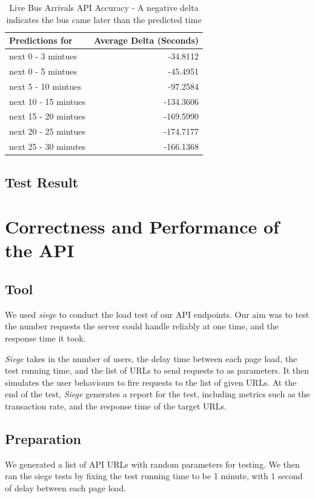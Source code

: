 \begin{table}
\centering
\begin{tabular}{@{}lr@{}} \toprule
Predictions for & Average Delta (Seconds) \\ \midrule
next 0 - 3 mintues & -34.8112 \\
next 0 - 5 mintues & -45.4951 \\
next 5 - 10 mintues & -97.2584 \\
next 10 - 15 mintues & -134.3606 \\
next 15 - 20 mintues & -169.5990 \\
next 20 - 25 mintues & -174.7177 \\
next 25 - 30 minutes & -166.1368 \\
\bottomrule
\end{tabular}
\caption{Live Bus Arrivals API Accuracy - A negative delta indicates the bus came later than the predicted time}
\label{table:countdown_evaluation}
\end{table}

\subsection{Test Result}

\section{Correctness and Performance of the API}
\subsection{Tool}
\par We used \textit{siege}\cite{siege} to conduct the load test of our API endpoints. Our aim was to test the number requests the server could handle reliably at one time, and the response time it took.

\par \textit{Siege} takes in the number of users, the delay time between each page load, the test running time, and the list of URLs to send requests to as parameters. It then simulates the user behaviours to fire requests to the list of given URLs. At the end of the test, \textit{Siege} generates a report for the test, including metrics such as the transaction rate, and the response time of the target URLs.

\subsection{Preparation}
\par We generated a list of API URLs with random parameters for testing. We then ran the siege tests by fixing the test running time to be 1 minute, with 1 second of delay between each page load.

